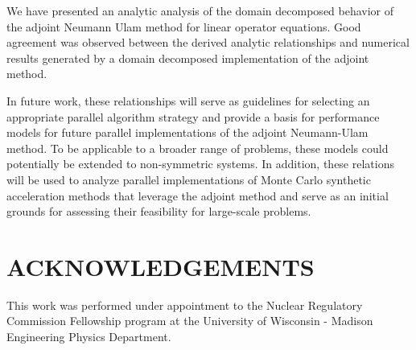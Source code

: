 \documentclass{mc2013}
\begin{document}
We have presented an analytic analysis of the domain decomposed
behavior of the adjoint Neumann Ulam method for linear operator
equations. Good agreement was observed between the derived analytic
relationships and numerical results generated by a domain decomposed
implementation of the adjoint method. 

In future work, these relationships will serve as guidelines for
selecting an appropriate parallel algorithm strategy and provide a
basis for performance models for future parallel implementations of
the adjoint Neumann-Ulam method. To be applicable to a broader range
of problems, these models could potentially be extended to
non-symmetric systems. In addition, these relations will be used to
analyze parallel implementations of Monte Carlo synthetic acceleration
methods that leverage the adjoint method and serve as an initial
grounds for assessing their feasibility for large-scale problems.

\section*{ACKNOWLEDGEMENTS}

This work was performed under appointment to the Nuclear Regulatory
Commission Fellowship program at the University of Wisconsin - Madison
Engineering Physics Department.

\setlength{\baselineskip}{12pt}


\end{document}
